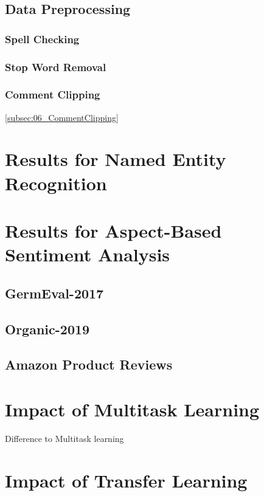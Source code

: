 \subsection{Data Preprocessing}
\label{subsec:06_dataPreprocessing}

\subsubsection{Spell Checking}

\subsubsection{Stop Word Removal}

\subsubsection{Comment Clipping}
\ref{subsec:06_CommentClipping}


\section{Results for Named Entity Recognition}

\section{Results for Aspect-Based Sentiment Analysis}

\subsection{GermEval-2017}
\label{sec:06_ResultsGermEval}

\subsection{Organic-2019}

\subsection{Amazon Product Reviews}

\section{Impact of Multitask Learning}
Difference to Multitask learning



\section{Impact of Transfer Learning}

